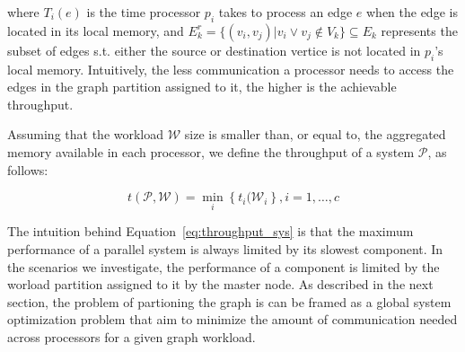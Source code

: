 where $T_i(e)$ is the time processor $p_i$ takes to process an edge $e$ when the edge is located in its local memory, and $E_k^{r} = \{(v_i,v_j) | v_i \vee v_j \notin V_k\} \subseteq E_k$ represents the subset of edges s.t. either the source or destination vertice is not located in $p_i$'s local memory. Intuitively, the less communication a processor needs to access the edges in the graph partition assigned to it, the higher is the achievable throughput.

Assuming that the workload $\mathcal{W}$ size is smaller than, or equal to, the aggregated memory available in each processor, we define the throughput of a system $\mathcal{P}$, as follows: 

\begin{equation}
t(\mathcal{P}, \mathcal{W}) = \min_{i}\left\{t_i(\mathcal{W}_i\right\}, i = {1, \ldots, c}
\label{eq:throughput_sys}
\end{equation}

The intuition behind Equation~\ref{eq:throughput_sys} is that the maximum performance of a parallel system is always limited by its slowest component. In the scenarios we investigate, the performance of a component is limited by the worload partition assigned to it by the master node. As described in the next section, the problem of partioning the graph is can be framed as a global system optimization problem that aim to minimize the amount of communication needed across processors for a given graph workload.


